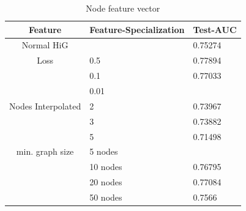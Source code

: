 \begin{table}[ht!]
    \centering
    \caption{Node feature vector}
    \label{node_features}
    \begin{tabular}{c || l| p{6cm} |}
        Feature            & Feature-Specialization & Test-AUC \\
        \hline
        \hline
        Normal HiG         &                        & 0.75274  \\
        \hline
        Loss               & 0.5                    & 0.77894  \\
                           & 0.1                    & 0.77033  \\
                           & 0.01                   &          \\
        \hline
        Nodes Interpolated & 2                      & 0.73967  \\
                           & 3                      & 0.73882  \\
                           & 5                      & 0.71498  \\
        \hline
        min. graph size    & 5 nodes                &          \\
                           & 10 nodes               & 0.76795  \\
                           & 20 nodes               & 0.77084  \\
                           & 50 nodes               & 0.7566   \\
    \end{tabular}
\end{table}

